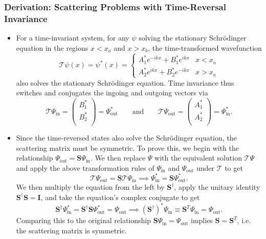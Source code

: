 \documentclass[11pt, a4paper]{article}
\newcommand{\Schro}{Schr\"{o}dinger\xspace}
\newcommand{\mat}[1]{\mathbf{#1}}  %
\renewcommand{\SS}{\mat{S}}  %
\newcommand{\T}{\mathcal{T}}  %
\renewcommand{\P}{\Psi}  %
\begin{document}
\subsubsection{Derivation: Scattering Problems with Time-Reversal Invariance}
\begin{itemize}
    \item For a time-invariant system, for any $ \psi $ solving the stationary \Schro equation in the regions $ x < x_{a} $ and $ x > x_{b} $, the time-transformed wavefunction
    \begin{equation*}
        \T \psi(x) = \psi^{*}(x) = 
        \begin{cases}
            A^{*}_{1} e^{-ikx} + B^{*}_{1} e^{ikx} & x < x_{a}\\
            A^{*}_{2} e^{ikx} + B^{*}_{2} e^{-ikx} & x > x_{a}
        \end{cases}
    \end{equation*}
    also solves the stationary \Schro equation. Time invariance thus switches and conjugates the ingoing and outgoing vectors via
    \begin{equation*}
        \T \Psi_{\text{in}} = 
        \begin{pmatrix}
            B_{1}^{*}\\
            B_{2}^{*}\\
        \end{pmatrix}
        = \Psi^{*}_{\text{out}}
        \qquad \text{and} \qquad 
        \T \Psi_{\text{out}} = 
        \begin{pmatrix}
            A_{1}^{*}\\
            A_{2}^{*}\\
        \end{pmatrix}
        = \Psi^{*}_{\text{in}}.
    \end{equation*}

    \item Since the time-reversed states also solve the \Schro equation, the scattering matrix must be symmetric. To prove this, we begin with the relationship $ \Psi_{\text{out}} = \SS \Psi_{\text{in}} $. We then replace $ \Psi $ with the equivalent solution $ \T \Psi $ and apply the above transformation rules of $ \P_{\text{in}} $ and $ \Psi_{\text{out}} $ under $ \T $ to get
    \begin{equation*}
        \T \Psi_{\text{out}} = \SS \T \Psi_{\text{in}} \implies \Psi_{\text{in}}^{*} = \SS \Psi_{\text{out}}^{*}.
    \end{equation*}
    We then multiply the equation from the left by $ \SS^{\dagger} $, apply the unitary identity $ \SS^{\dagger}\SS = \mat{I} $, and take the equation's complex conjugate to get
    \begin{equation*}
        \SS^{\dagger}\Psi_{\text{in}}^{*} = \SS^{\dagger}\SS \Psi_{\text{out}}^{*} = \Psi_{\text{out}} \implies (\SS^{\dagger})^{*} \Psi_{\text{in}} \equiv \SS^{T}\Psi_{\text{in}} = \Psi_{\text{out}}.
    \end{equation*}
    Comparing this to the original relationship $ \SS \Psi_{\text{in}} = \Psi_{\text{out}} $ implies $ \SS = \SS^{T} $, i.e. the scattering matrix is symmetric.


\end{itemize}
\end{document}

